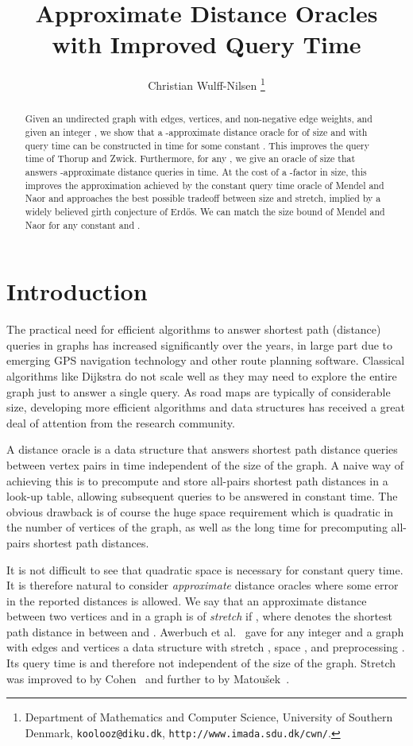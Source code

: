 \documentclass[11pt]{article}
\title{Approximate Distance Oracles with Improved Query Time}
\author{Christian Wulff-Nilsen
        \footnote{Department of Mathematics and Computer Science,
                  University of Southern Denmark,
                  \texttt{koolooz@diku.dk},
                  \texttt{http://www.imada.sdu.dk/cwn/}.}}
\date{}
\begin{document}
\maketitle
\begin{abstract}
Given an undirected graph  with  edges,  vertices, and non-negative edge weights, and given an integer , we show
that a -approximate distance oracle for  of size  and with  query time can be constructed in
 time for some constant .
This improves the  query time of Thorup and Zwick.
Furthermore, for any , we give an oracle of size  that
answers -approximate distance queries in  time.
At the cost of a -factor in size, this improves the  approximation achieved by the constant query time oracle of
Mendel and Naor and approaches the best possible tradeoff between size and stretch, implied by a widely believed girth conjecture
of Erd\H{o}s. We can match the  size bound of Mendel and Naor for any constant  and
.
\end{abstract}
\newpage

\section{Introduction}\label{sec:Intro}
The practical need for efficient algorithms to answer shortest path (distance) queries in graphs has increased significantly over
the years, in large part due to emerging GPS navigation technology and other route planning software.
Classical algorithms like Dijkstra do not scale well as they may need to explore the entire
graph just to answer a single query. As road maps are typically of considerable size, developing more efficient algorithms and data
structures has received a great deal of attention from the research community.

A distance oracle is a data structure that answers shortest path distance queries between vertex pairs in time independent of the size of the graph. A naive way
of achieving this is to precompute and store all-pairs shortest path distances in a look-up table, allowing subsequent
queries to be answered in
constant time. The obvious drawback is of course the huge space requirement which is quadratic in the number of vertices of the graph,
as well as the long time for precomputing all-pairs shortest path distances.

It is not difficult to see that quadratic space is necessary for constant
query time. It is therefore natural to consider \emph{approximate} distance
oracles where some error in the reported distances is allowed. We say that
an approximate distance  between two vertices  and 
in a graph  is of \emph{stretch}  if , where  denotes the
shortest path distance in  between  and . Awerbuch et
al.~\cite{Awerbuch98} gave for any integer  and a graph with  edges and  vertices
a data structure with stretch , space
, and preprocessing . Its query
time is  and therefore not independent of the size of
the graph. Stretch was improved to  by Cohen~\cite{Cohen98} and further to  by Matou\v{s}ek~\cite{Matousek96}.
\end{document}
